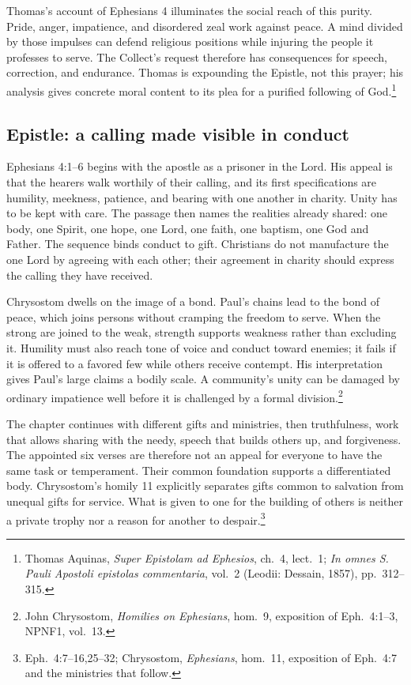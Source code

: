 Thomas's account of Ephesians 4 illuminates the social reach of this purity. Pride, anger, impatience, and disordered zeal work against peace. A mind divided by those impulses can defend religious positions while injuring the people it professes to serve. The Collect's request therefore has consequences for speech, correction, and endurance. Thomas is expounding the Epistle, not this prayer; his analysis gives concrete moral content to its plea for a purified following of God.\footnote{Thomas Aquinas, \textit{Super Epistolam ad Ephesios}, ch.~4, lect.~1; \textit{In omnes S. Pauli Apostoli epistolas commentaria}, vol.~2 (Leodii: Dessain, 1857), pp.~312--315.}

\subsection{Epistle: a calling made visible in conduct}
Ephesians 4:1--6 begins with the apostle as a prisoner in the Lord. His appeal is that the hearers walk worthily of their calling, and its first specifications are humility, meekness, patience, and bearing with one another in charity. Unity has to be kept with care. The passage then names the realities already shared: one body, one Spirit, one hope, one Lord, one faith, one baptism, one God and Father. The sequence binds conduct to gift. Christians do not manufacture the one Lord by agreeing with each other; their agreement in charity should express the calling they have received.

Chrysostom dwells on the image of a bond. Paul's chains lead to the bond of peace, which joins persons without cramping the freedom to serve. When the strong are joined to the weak, strength supports weakness rather than excluding it. Humility must also reach tone of voice and conduct toward enemies; it fails if it is offered to a favored few while others receive contempt. His interpretation gives Paul's large claims a bodily scale. A community's unity can be damaged by ordinary impatience well before it is challenged by a formal division.\footnote{John Chrysostom, \textit{Homilies on Ephesians}, hom.~9, exposition of Eph.~4:1--3, NPNF1, vol.~13.}

The chapter continues with different gifts and ministries, then truthfulness, work that allows sharing with the needy, speech that builds others up, and forgiveness. The appointed six verses are therefore not an appeal for everyone to have the same task or temperament. Their common foundation supports a differentiated body. Chrysostom's homily 11 explicitly separates gifts common to salvation from unequal gifts for service. What is given to one for the building of others is neither a private trophy nor a reason for another to despair.\footnote{Eph.~4:7--16,25--32; Chrysostom, \textit{Ephesians}, hom.~11, exposition of Eph.~4:7 and the ministries that follow.}

